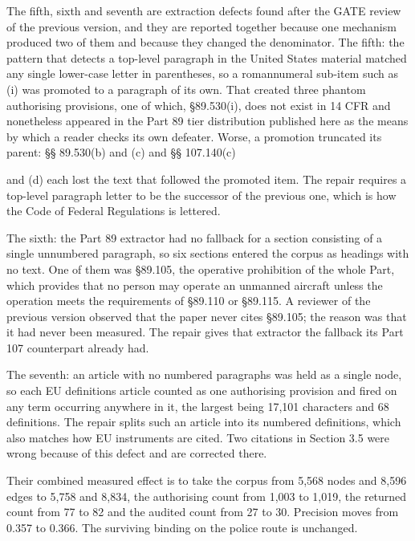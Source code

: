 The fifth, sixth and seventh are extraction defects found after the GATE review of the previous version, and they are reported together because one mechanism produced two of them and because they changed the denominator. The fifth: the pattern that detects a top-level paragraph in the United States material matched any single lower-case letter in parentheses, so a romannumeral sub-item such as (i) was promoted to a paragraph of its own. That created three phantom authorising provisions, one of which, \S{}89.530(i), does not exist in 14 CFR and nonetheless appeared in the Part 89 tier distribution published here as the means by which a reader checks its own defeater. Worse, a promotion truncated its parent: \S{}\S{} 89.530(b) and (c) and \S{}\S{} 107.140(c)

and (d) each lost the text that followed the promoted item. The repair requires a top-level paragraph letter to be the successor of the previous one, which is how the Code of Federal Regulations is lettered.

The sixth: the Part 89 extractor had no fallback for a section consisting of a single unnumbered paragraph, so six sections entered the corpus as headings with no text. One of them was \S{}89.105, the operative prohibition of the whole Part, which provides that no person may operate an unmanned aircraft unless the operation meets the requirements of \S{}89.110 or \S{}89.115. A reviewer of the previous version observed that the paper never cites \S{}89.105; the reason was that it had never been measured. The repair gives that extractor the fallback its Part 107 counterpart already had.

The seventh: an article with no numbered paragraphs was held as a single node, so each EU definitions article counted as one authorising provision and fired on any term occurring anywhere in it, the largest being 17,101 characters and 68 definitions. The repair splits such an article into its numbered definitions, which also matches how EU instruments are cited. Two citations in Section 3.5 were wrong because of this defect and are corrected there.

Their combined measured effect is to take the corpus from 5,568 nodes and 8,596 edges to 5,758 and 8,834, the authorising count from 1,003 to 1,019, the returned count from 77 to 82 and the audited count from 27 to 30. Precision moves from 0.357 to 0.366. The surviving binding on the police route is unchanged.

